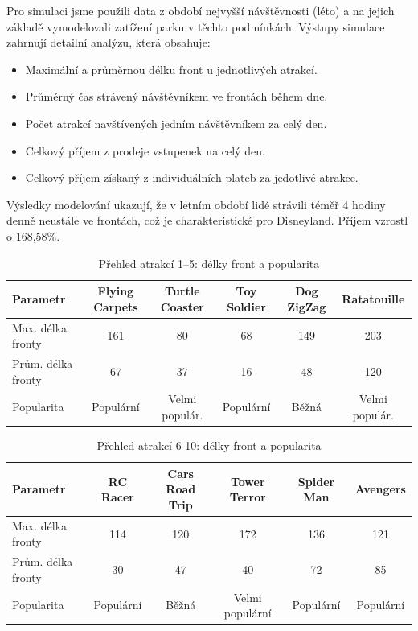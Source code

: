 \documentclass[a4paper,12pt]{article}
\begin{document}
Pro simulaci jsme použili data z období nejvyšší návštěvnosti (léto) a na jejich základě vymodelovali zatížení parku v těchto podmínkách. Výstupy simulace zahrnují detailní analýzu, která obsahuje:
\begin{itemize}
	\item Maximální a průměrnou délku front u jednotlivých atrakcí.
	\item Průměrný čas strávený návštěvníkem ve frontách během dne.
	\item Počet atrakcí navštívených jedním návštěvníkem za celý den.
	\item Celkový příjem z prodeje vstupenek na celý den.
	\item Celkový příjem získaný z individuálních plateb za jedotlivé atrakce.
\end{itemize}


Výsledky modelování ukazují, že v letním období lidé strávili téměř 4 hodiny denně neustále ve frontách, což je charakteristické pro Disneyland. Příjem vzrostl o 168,58\%.

\begin{table}[h!]
	\centering
	\caption{Přehled atrakcí 1–5: délky front a popularita}
	\label{tab:attractions_overview_1_5}
	\begin{tabular}{|l|c|c|c|c|c|}
		\hline
		\textbf{Parametr}&\textbf{Flying Carpets}&\textbf{Turtle Coaster}&\textbf{Toy Soldier}&\textbf{Dog ZigZag}&\textbf{Ratatouille}\\ \hline
		Max. délka fronty   &161                 & 80                 & 68                 & 149                 & 203      \\ \hline
		Prům. délka fronty  &67                 & 37                 & 16                 & 48                 & 120         \\ \hline
		Popularita          &Populární         &Velmi populár.        &Populární          & Běžná          &Velmi populár.\\ \hline
	\end{tabular}
\end{table}
\begin{table}[h!]
	\centering
	\caption{Přehled atrakcí 6-10: délky front a popularita}
	\label{tab:attractions_overview_6_10}
	\begin{tabular}{|l|c|c|c|c|c|}
		\hline
		\textbf{Parametr}   & \textbf{RC  Racer}& \textbf{Cars Road Trip}& \textbf{Tower Terror}& \textbf{Spider Man}& \textbf{Avengers}\\ \hline
		Max. délka fronty   & 114                 & 120                & 172                 & 136               & 121               \\ \hline
		Prům. délka fronty  & 30                & 47                 & 40                & 72                 & 85               \\ \hline
		Popularita          & Populární             & Běžná              & Velmi populární        & Populární          & Populární   \\ \hline
	\end{tabular}
\end{table}
\end{document}
